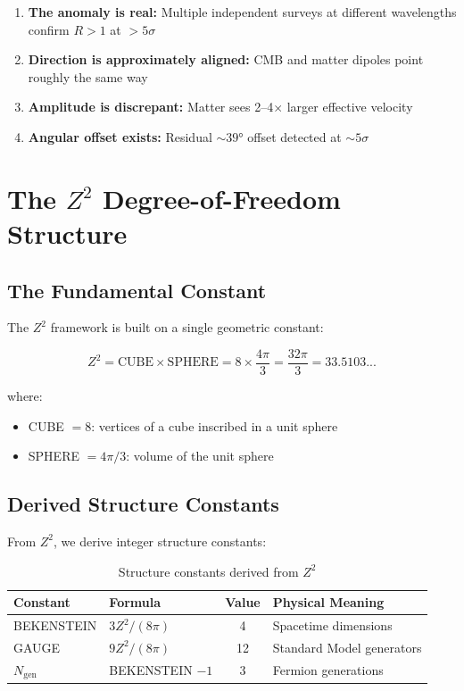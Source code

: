 \documentclass[12pt,a4paper]{article}
\begin{document}
\begin{enumerate}
    \item \textbf{The anomaly is real:} Multiple independent surveys at different wavelengths confirm $R > 1$ at $>5\sigma$
    \item \textbf{Direction is approximately aligned:} CMB and matter dipoles point roughly the same way
    \item \textbf{Amplitude is discrepant:} Matter sees 2--4$\times$ larger effective velocity
    \item \textbf{Angular offset exists:} Residual $\sim 39°$ offset detected at $\sim 5\sigma$
\end{enumerate}

\section{The $Z^2$ Degree-of-Freedom Structure}

\subsection{The Fundamental Constant}

The $Z^2$ framework is built on a single geometric constant:

\begin{equation}
\boxed{Z^2 = \text{CUBE} \times \text{SPHERE} = 8 \times \frac{4\pi}{3} = \frac{32\pi}{3} = 33.5103...}
\end{equation}

where:
\begin{itemize}
    \item CUBE $= 8$: vertices of a cube inscribed in a unit sphere
    \item SPHERE $= 4\pi/3$: volume of the unit sphere
\end{itemize}

\subsection{Derived Structure Constants}

From $Z^2$, we derive integer structure constants:

\begin{table}[H]
\centering
\caption{Structure constants derived from $Z^2$}
\begin{tabular}{llcl}
\toprule
Constant & Formula & Value & Physical Meaning \\
\midrule
BEKENSTEIN & $3Z^2/(8\pi)$ & 4 & Spacetime dimensions \\
GAUGE & $9Z^2/(8\pi)$ & 12 & Standard Model generators \\
$N_{\text{gen}}$ & BEKENSTEIN $- 1$ & 3 & Fermion generations \\
\bottomrule
\end{tabular}
\end{table}
\end{document}
